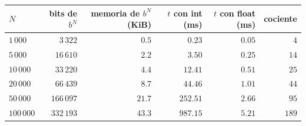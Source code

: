 \begin{tabular}{lrrrrr}
\toprule
$N$ & bits de $b^N$ & memoria de $b^N$ (KiB) & $t$ con int (ms) & $t$ con float (ms) & cociente \\
\midrule
$1\,000$ & $3\,322$ & $0.5$ & $0.23$ & $0.05$ & $4$ \\
$5\,000$ & $16\,610$ & $2.2$ & $3.50$ & $0.25$ & $14$ \\
$10\,000$ & $33\,220$ & $4.4$ & $12.41$ & $0.51$ & $25$ \\
$20\,000$ & $66\,439$ & $8.7$ & $44.46$ & $1.01$ & $44$ \\
$50\,000$ & $166\,097$ & $21.7$ & $252.51$ & $2.66$ & $95$ \\
$100\,000$ & $332\,193$ & $43.3$ & $987.15$ & $5.21$ & $189$ \\
\bottomrule
\end{tabular}
